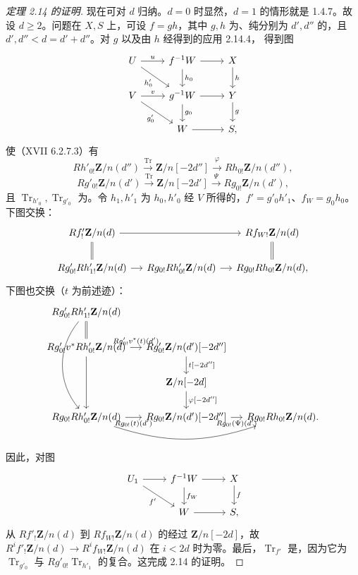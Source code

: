 \begin{proof}[定理 2.14 的证明]
现在可对 $d$ 归纳。$d=0$ 时显然，$d=1$ 的情形就是 1.4.7。故设 $d\ge2$。问题在 $X,S$ 上，可设 $f=gh$，其中 $g,h$ 为、纯分别为 $d',d''$ 的，且 $d',d''<d=d'+d''$。对 $g$ 以及由 $h$ 经得到的应用 2.14.4，
得到图
\[\begin{tikzcd}U\arrow[r,"u"]\arrow[dr,"h'_0"']&f^{-1}W\arrow[r]\arrow[d,"h_0"]&X\arrow[d,"h"]\\V\arrow[r,"v"]\arrow[dr,"g'_0"']&g^{-1}W\arrow[r]\arrow[d,"g_0"]&Y\arrow[d,"g"]\\&W\arrow[r]&S,
\end{tikzcd}\]
使（XVII 6.2.7.3）有
\[Rh'_{0!}\mathbf Z/n(d'')\xrightarrow{\operatorname{Tr}}\mathbf Z/n[-2d'']\xrightarrow\varphi Rh_{0!}\mathbf Z/n(d''),\]
\[Rg'_{0!}\mathbf Z/n(d')\xrightarrow{\operatorname{Tr}}\mathbf Z/n[-2d']\xrightarrow\Psi Rg_{0!}\mathbf Z/n(d'),\]
且 $\operatorname{Tr}_{h'_0},\operatorname{Tr}_{g'_0}$ 为。令 $h_1,h'_1$ 为 $h_0,h'_0$ 经 $V$ 所得的，$f'=g'_0h'_1$、$f_W=g_0h_0$。下图交换：
\[\begin{tikzcd}[column sep=small]
Rf'_!\mathbf Z/n(d)\arrow[rr]\arrow[d,equal]&&Rf_{W!}\mathbf Z/n(d)\arrow[d,equal]\\
Rg'_{0!}Rh'_{1!}\mathbf Z/n(d)\arrow[r]&Rg_{0!}Rh'_{0!}\mathbf Z/n(d)\arrow[r]&Rg_{0!}Rh_{0!}\mathbf Z/n(d),
\end{tikzcd}\]
下图也交换（$t$ 为前述迹）：
\[\begin{tikzcd}[column sep=small]
Rg'_{0!}Rh'_{1!}\mathbf Z/n(d)\arrow[d,equal]\arrow[ddd,bend right=40]&&\\
Rg'_{0!}v^*Rh'_{0!}\mathbf Z/n(d)\arrow[r,"Rg'_{0!}v^*(t)(d')"]\arrow[dd]&Rg'_{0!}\mathbf Z/n(d')[-2d'']\arrow[d,"{t[-2d'']}"]&\\
&\mathbf Z/n[-2d]\arrow[d,"{\varphi[-2d'']}"]&\\
Rg_{0!}Rh'_{0!}\mathbf Z/n(d)\arrow[r,"Rg_{0!}(t)(d')"']\arrow[rr,bend right=18]&Rg_{0!}\mathbf Z/n(d')[-2d'']\arrow[r,"Rg_{0!}(\Psi)(d')"']&Rg_{0!}Rh_{0!}\mathbf Z/n(d).
\end{tikzcd}\]
因此，对图
\[\begin{tikzcd}U_1\arrow[r]\arrow[dr,"f'"']&f^{-1}W\arrow[r]\arrow[d,"f_W"]&X\arrow[d,"f"]\\&W\arrow[r]&S,\end{tikzcd}\]
从 $Rf'_!\mathbf Z/n(d)$ 到 $Rf_{W!}\mathbf Z/n(d)$ 的经过 $\mathbf Z/n[-2d]$，故 $R^if'_!\mathbf Z/n(d)\to R^if_{W!}\mathbf Z/n(d)$ 在 $i<2d$ 时为零。最后，$\operatorname{Tr}_{f'}$ 是，因为它为 $\operatorname{Tr}_{g'_0}$ 与 $Rg'_{0!}\operatorname{Tr}_{h'_1}$ 的复合。这完成 2.14 的证明。
\end{proof}
